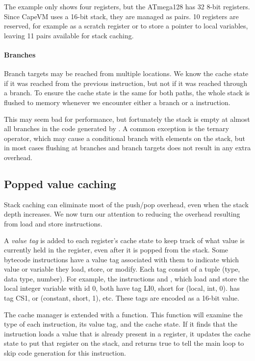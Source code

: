 The example only shows four registers, but the ATmega128 has 32 8-bit registers. Since CapeVM uses a 16-bit stack, they are managed as pairs. 10 registers are reserved, for example as a scratch register or to store a pointer to local variables, leaving 11 pairs available for stack caching.

\paragraph{Branches} Branch targets may be reached from multiple locations. We know the cache state if it was reached from the previous instruction, but not if it was reached through a branch. To ensure the cache state is the same for both paths, the whole stack is flushed to memory whenever we encounter either a branch or a  instruction. 

This may seem bad for performance, but fortunately the stack is empty at almost all branches in the code generated by . A common exception is the ternary  operator, which may cause a conditional branch with elements on the stack, but in most cases flushing at branches and branch targets does not result in any extra overhead.

\subsection{Popped value caching}
\label{sec-optimisations-popped-value-caching}


Stack caching can eliminate most of the push/pop overhead, even when the stack depth increases. We now turn our attention to reducing the overhead resulting from load and store instructions.

A \emph{value tag} is added to each register's cache state to keep track of what value is currently held in the register, even after it is popped from the stack. Some bytecode instructions have a value tag associated with them to indicate which value or variable they load, store, or modify. Each tag consist of a tuple (type, data type, number). For example, the instructions  and , which load and store the local integer variable with id 0, both have tag LI0, short for (local, int, 0).  has tag CS1, or (constant, short, 1), etc. These tags are encoded as a 16-bit value.

The cache manager is extended with a  function. This function will examine the type of each instruction, its value tag, and the cache state. If it finds that the instruction loads a value that is already present in a register, it updates the cache state to put that register on the stack, and returns true to tell the main loop to skip code generation for this instruction.

